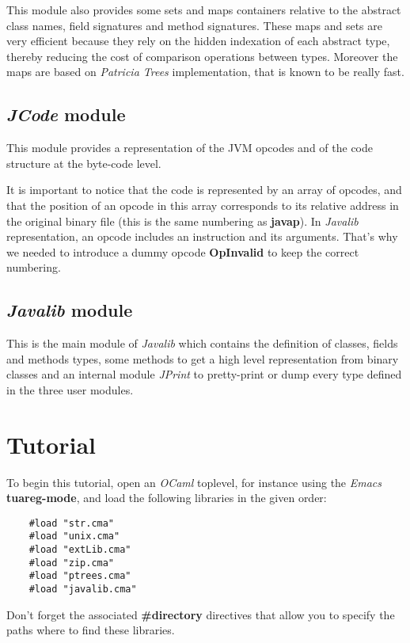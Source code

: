 \documentclass{article}
\begin{document}
This module also provides some sets and maps containers relative to
the abstract class names, field signatures and method signatures.
These maps and sets are very efficient because they rely on the
hidden indexation of each abstract type, thereby reducing the cost
of comparison operations between types. Moreover the maps are based
on \emph{Patricia Trees} implementation, that is known to be really
fast.

\subsection{\emph{JCode} module}

This module provides a representation of the JVM opcodes and of the
code structure at the byte-code level.

It is important to notice that the code is represented by an array
of opcodes, and that the position of an opcode in this array
corresponds to its relative address in the original binary file
(this is the same numbering as \textbf{javap}). In \emph{Javalib}
representation, an opcode includes an instruction and its
arguments. That's why we needed to introduce a dummy opcode
\textbf{OpInvalid} to keep the correct numbering.

\subsection{\emph{Javalib} module}

This is the main module of \emph{Javalib} which contains the
definition of classes, fields and methods types, some methods to
get a high level representation from binary classes and an internal
module \emph{JPrint} to pretty-print or dump every type defined in
the three user modules.

\section{Tutorial}

To begin this tutorial, open an \emph{OCaml} toplevel, for instance
using the \emph{Emacs} \textbf{tuareg-mode}, and load the following
libraries in the given order:

\begin{verbatim}
    #load "str.cma"
    #load "unix.cma"
    #load "extLib.cma"
    #load "zip.cma"
    #load "ptrees.cma"
    #load "javalib.cma"
\end{verbatim}
Don't forget the associated \textbf{\#directory} directives that
allow you to specify the paths where to find these libraries.
\end{document}
